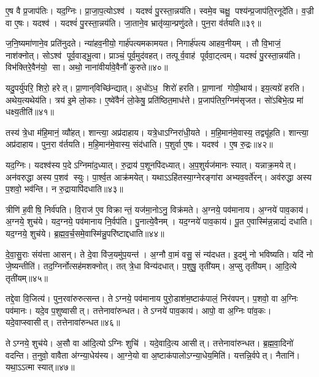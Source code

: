 ए॒ष वै प्र॒जाप॑तिः। यद॒ग्निः। प्रा॒जा॒प॒त्योऽश्व॑। यदश्वं॑ पु॒रस्ता॒न्नय॑ति। स्वमे॒व चक्षु॒ पश्य॑न्प्र॒जाप॑ति॒रनूदे॑ति। व॒ज्री वा ए॒षः। यदश्व॑। यदश्वं॑ पु॒रस्ता॒न्नय॑ति। जा॒ताने॒व भ्रातृ॑व्या॒न्प्रणु॑दते। पुन॒रा व॑र्तयति॥३९॥

ज॒नि॒ष्यमा॑णाने॒व प्रति॑नुदते। न्या॑हव॒नीयो॒ गार्\mbox{}ह॑पत्य\-मकामयत। निगार्\mbox{}ह॑पत्य आहव॒नीयम्। तौ वि॒भाजं॒ नाश॑क्नोत्। सोऽश्व॑ पूर्व॒वाड्भू॒त्वा। प्राञ्चं॒ पूर्व॒मुद॑वहत्। तत्पूर्व॒वाह॑ पूर्ववा॒ट्त्वम्। यदश्वं॑ पु॒रस्ता॒न्नय॑ति। विभ॑क्तिरे॒वैन॑यो॒ सा। अथो॒ नाना॑वीर्यावे॒वैनौ॑ कुरुते॥४०॥

यदु॒पर्यु॑परि॒ शिरो॒ हरेत्। प्रा॒णान्‌विच्छि॑न्द्यात्। अ॒धो॑ऽध॒ शिरो॑ हरति। प्रा॒णानां गोपी॒थाय॑। इय॒त्यग्रे॑ हरति। अथेय॒त्यथेय॑ति। त्रय॑ इ॒मे लो॒काः। ए॒ष्वे॑वैनं॑ लो॒केषु॒ प्रति॑ष्ठित॒माध॑त्ते। प्र॒जाप॑तिर॒ग्निम॑सृजत। सो॑ऽबिभे॒त्प्र मा॑ धक्ष्य॒तीति॑॥४१॥

तस्य॑ त्रे॒धा म॑हि॒मानं॒ व्यौ॑हत्। शान्त्या॒ अप्र॑दाहाय। यत्रे॒धाऽग्निरा॑धी॒यते। म॒हि॒मान॑मे॒वास्य॒ तद्व्यू॑हति। शान्त्या॒ अप्र॑दाहाय। पुन॒रा व॑र्तयति। म॒हि॒मान॑मे॒वास्य॒ संद॑धाति। प॒शुर्वा ए॒षः। यदश्व॑। ए॒ष रु॒द्रः॥४२॥

यद॒ग्निः। यदश्व॑स्य प॒देऽग्निमा॑द॒ध्यात्। रु॒द्राय॑ प॒शूनपि॑दध्यात्। अ॒प॒शुर्यज॑मानः स्यात्। यन्नाक्र॒मयेत्। अन॑वरुद्धा अस्य प॒शव॑ स्युः। पा॒र्श्व॒त आक्र॑मयेत्। यथाऽऽहि॑तस्या॒ग्नेरङ्गा॑रा अभ्यव॒वर्ते॑रन्। अव॑रुद्धा अस्य प॒शवो॒ भव॑न्ति। न रु॒द्रायापि॑दधाति॥४३॥

त्रीणि॑ ह॒वीषि॒ निर्व॑पति। वि॒राज॑ ए॒व विक्रान्तं॒ यज॑मा॒नोऽनु॒ विक्र॑मते। अ॒ग्नये॒ पव॑मानाय। अ॒ग्नये॑ पाव॒काय॑। अ॒ग्नये॒ शुच॑ये। यद॒ग्नये॒ पव॑मानाय नि॒र्वप॑ति। पु॒नात्ये॒वैनम्। यद॒ग्नये॑ पाव॒काय॑। पू॒त ए॒वास्मि॑न्न॒न्नाद्यं॑ दधाति। यद॒ग्नये॒ शुच॑ये। ब्र॒ह्म॒व॒र्च॒समे॒वास्मि॑न्नु॒परि॑ष्टाद्दधाति॥४४॥\anuvakamend[ए॒न॒मा॒ह॒व॒नीयं॑ धत्तेऽश्व॒त्वं व॑र्तयति कुरुत॒ इति॑ रु॒द्रो द॑धाति॒ य॒दग्नये॒ शुच॑य॒ एकं॑ च]

दे॒वा॒सु॒राः संय॑त्ता आसन्। ते दे॒वा वि॑ज॒यमु॑प॒यन्त॑। अ॒ग्नौ वा॒मं वसु॒ सं न्य॑दधत। इ॒दमु॑ नो भविष्यति। यदि॑ नो जे॒ष्यन्तीति॑। तद॒ग्निर्नोत्सह॑मशक्नोत्। तत् त्रे॒धा विन्य॑दधात्। प॒शुषु॒ तृती॑यम्। अ॒प्सु तृती॑यम्। आ॒दि॒त्ये तृती॑यम्॥४५॥

तद्दे॒वा वि॒जित्य॑। पुन॒रवा॑रुरुत्सन्त। तेऽग्नये॒ पव॑मानाय पुरो॒डाश॑म॒ष्टाक॑पालं॒ निर॑वपन्। प॒शवो॒ वा अ॒ग्निः पव॑मानः। यदे॒व प॒शुष्वासीत्। तत्तेनावा॑रुन्धत। तेऽग्नये॑ पाव॒काय॑। आपो॒ वा अ॒ग्निः पा॑व॒कः। यदे॒वाप्स्वासीत्। तत्तेनावा॑रुन्धत॥४६॥

तेऽग्नये॒ शुच॑ये। अ॒सौ वा आ॑दि॒त्योऽग्निः शुचि॑। यदे॒वादि॒त्य आसीत्। तत्तेनावा॑रुन्धत। ब्र॒ह्म॒वा॒दिनो॑ वदन्ति। त॒नुवो॒ वावैता अ॑ग्न्या॒धेय॑स्य। आ॒ग्ने॒यो वा अ॒ष्टाक॑पालोऽग्न्या॒धेय॒मिति॑। यत्तन्नि॒र्वपेत्। नैतानि॑। यथा॒ऽऽत्मा स्यात्॥४७॥


